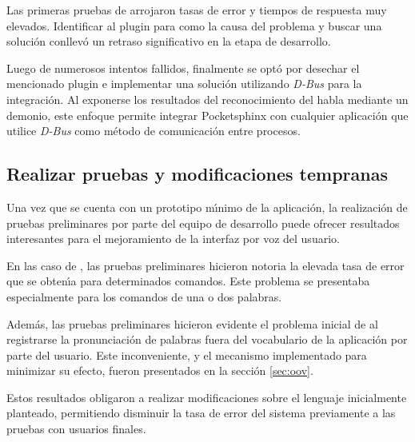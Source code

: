 Las primeras pruebas de  arrojaron tasas de error y tiempos de
respuesta muy elevados. Identificar al plugin para  como la causa del problema
y buscar una soluci\'on conllev\'o un retraso significativo en la etapa de desarrollo.

Luego de numerosos intentos fallidos, finalmente se opt\'o por desechar el mencionado plugin
e implementar una soluci\'on utilizando \emph{D-Bus} para la integraci\'on. Al exponerse los
resultados del reconocimiento del habla mediante un demonio, este enfoque permite integrar
Pocketsphinx con cualquier aplicaci\'on que utilice \emph{D-Bus} como m\'etodo de comunicaci\'on
entre procesos.

\subsection{Realizar pruebas y modificaciones tempranas}
Una vez que se cuenta con un prototipo m{\'\i}nimo de la aplicaci\'on, la realizaci\'on de pruebas preliminares
por parte del equipo de desarrollo puede ofrecer resultados interesantes para el mejoramiento de la 
interfaz por voz del usuario.

En las caso de , las pruebas preliminares hicieron notoria la elevada tasa
de error que se obten{\'\i}a para determinados comandos. Este problema se presentaba especialmente para
los comandos de una o dos palabras.

Adem\'as, las pruebas preliminares hicieron evidente el problema inicial de 
al registrarse la pronunciaci\'on de palabras fuera del vocabulario de la aplicaci\'on por parte del usuario.
Este inconveniente, y el mecanismo implementado para minimizar su efecto, fueron presentados en la 
secci\'on \ref{sec:oov}. 

Estos resultados obligaron a realizar modificaciones sobre el lenguaje inicialmente planteado,
permitiendo disminuir la tasa de error del sistema previamente a las pruebas con usuarios
finales.